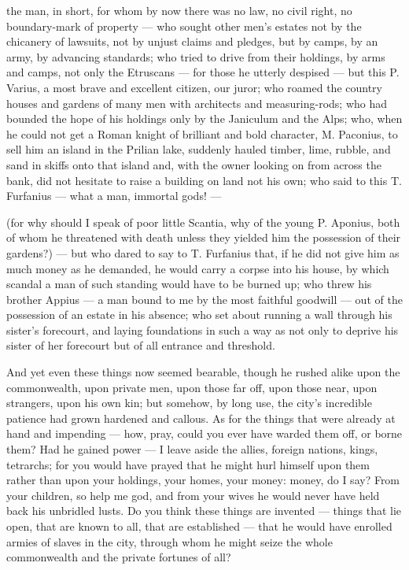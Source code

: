 the man, in short, for whom by now there was no law, no civil right, no boundary-mark of property --- who sought other men's estates not by the chicanery of lawsuits, not by unjust claims and pledges, but by camps, by an army, by advancing standards; who tried to drive from their holdings, by arms and camps, not only the Etruscans --- for those he utterly despised --- but this P. Varius, a most brave and excellent citizen, our juror; who roamed the country houses and gardens of many men with architects and measuring-rods; who had bounded the hope of his holdings only by the Janiculum and the Alps; who, when he could not get a Roman knight of brilliant and bold character, M. Paconius, to sell him an island in the Prilian lake, suddenly hauled timber, lime, rubble, and sand in skiffs onto that island and, with the owner looking on from across the bank, did not hesitate to raise a building on land not his own; who said to this T. Furfanius --- what a man, immortal gods! ---

 (for why should I speak of poor little Scantia, why of the young P. Aponius, both of whom he threatened with death unless they yielded him the possession of their gardens?) --- but who dared to say to T. Furfanius that, if he did not give him as much money as he demanded, he would carry a corpse into his house, by which scandal a man of such standing would have to be burned up; who threw his brother Appius --- a man bound to me by the most faithful goodwill --- out of the possession of an estate in his absence; who set about running a wall through his sister's forecourt, and laying foundations in such a way as not only to deprive his sister of her forecourt but of all entrance and threshold.

 And yet even these things now seemed bearable, though he rushed alike upon the commonwealth, upon private men, upon those far off, upon those near, upon strangers, upon his own kin; but somehow, by long use, the city's incredible patience had grown hardened and callous. As for the things that were already at hand and impending --- how, pray, could you ever have warded them off, or borne them? Had he gained power --- I leave aside the allies, foreign nations, kings, tetrarchs; for you would have prayed that he might hurl himself upon them rather than upon your holdings, your homes, your money: money, do I say? From your children, so help me god, and from your wives he would never have held back his unbridled lusts. Do you think these things are invented --- things that lie open, that are known to all, that are established --- that he would have enrolled armies of slaves in the city, through whom he might seize the whole commonwealth and the private fortunes of all?

